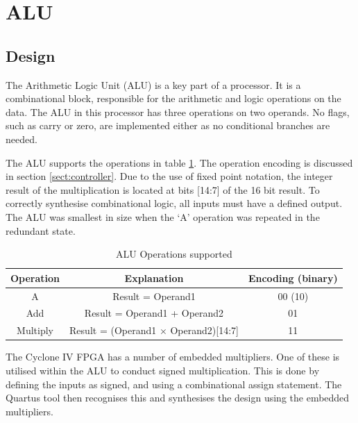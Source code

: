 

\section{ALU}

\subsection{Design}
The Arithmetic Logic Unit (ALU) is a key part of a processor. 
It is a combinational block, responsible for the arithmetic and logic operations on the data.
The ALU in this processor has three operations on two operands.
No flags, such as carry or zero, are implemented either as no conditional branches are needed.

The ALU supports the operations in table \ref{tab:aluops}.
The operation encoding is discussed in section \ref{sect:controller}.
Due to the use of fixed point notation, the integer result of the multiplication is located at bits [14:7] of the 16 bit result.
To correctly synthesise combinational logic, all inputs must have a defined output.
The ALU was smallest in size when the `A' operation was repeated in the redundant state.

\begin{table}
\caption{ALU Operations supported}
\label{tab:aluops}
\begin{tabular}{ccc} \toprule
Operation & Explanation & Encoding (binary)\\  \midrule
A & Result = Operand1 & 00 (10) \\
Add & Result = Operand1 + Operand2 & 01 \\
Multiply & Result = (Operand1 $\times$ Operand2)[14:7] & 11 \\ \bottomrule
\end{tabular}
\end{table}


The Cyclone IV FPGA has a number of embedded multipliers. 
One of these is utilised within the ALU to conduct signed multiplication. 
This is done by defining the inputs as signed, and using a combinational assign statement.
The Quartus tool then recognises this and synthesises the design using the embedded multipliers.



